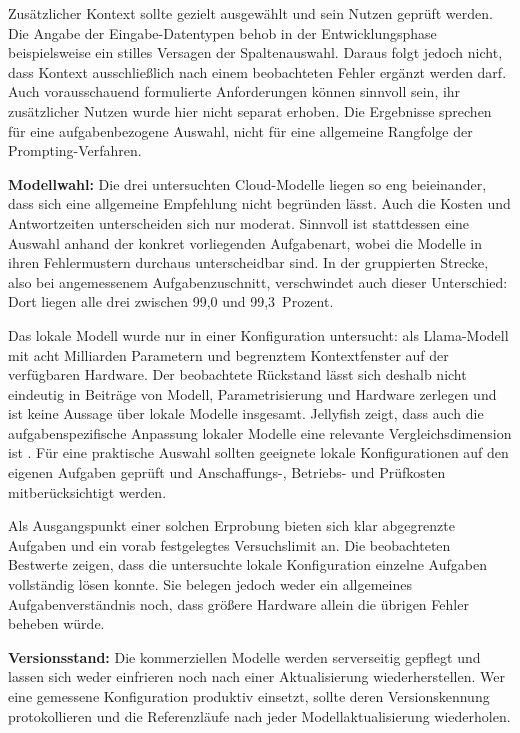 Zusätzlicher Kontext sollte gezielt ausgewählt und sein Nutzen geprüft werden. Die Angabe der Eingabe-Datentypen behob in der Entwicklungsphase beispielsweise ein stilles Versagen der Spaltenauswahl. Daraus folgt jedoch nicht, dass Kontext ausschließlich nach einem beobachteten Fehler ergänzt werden darf. Auch vorausschauend formulierte Anforderungen können sinnvoll sein, ihr zusätzlicher Nutzen wurde hier nicht separat erhoben. Die Ergebnisse sprechen für eine aufgabenbezogene Auswahl, nicht für eine allgemeine Rangfolge der Prompting-Verfahren.

\noindent\textbf{Modellwahl:} Die drei untersuchten Cloud-Modelle liegen so eng beieinander, dass sich eine allgemeine Empfehlung nicht begründen lässt. Auch die Kosten und Antwortzeiten unterscheiden sich nur moderat. Sinnvoll ist stattdessen eine Auswahl anhand der konkret vorliegenden Aufgabenart, wobei die Modelle in ihren Fehlermustern durchaus unterscheidbar sind. In der gruppierten Strecke, also bei angemessenem Aufgabenzuschnitt, verschwindet auch dieser Unterschied: Dort liegen alle drei zwischen 99,0 und 99,3~Prozent.

 Das lokale Modell wurde nur in einer Konfiguration untersucht: als Llama-Modell mit acht Milliarden Parametern und begrenztem Kontextfenster auf der verfügbaren Hardware. Der beobachtete Rückstand lässt sich deshalb nicht eindeutig in Beiträge von Modell, Parametrisierung und Hardware zerlegen und ist keine Aussage über lokale Modelle insgesamt. Jellyfish zeigt, dass auch die aufgabenspezifische Anpassung lokaler Modelle eine relevante Vergleichsdimension ist \autocite{zhangJellyfish2024}. Für eine praktische Auswahl sollten geeignete lokale Konfigurationen auf den eigenen Aufgaben geprüft und Anschaffungs-, Betriebs- und Prüfkosten mitberücksichtigt werden.

Als Ausgangspunkt einer solchen Erprobung bieten sich klar abgegrenzte Aufgaben und ein vorab festgelegtes Versuchslimit an. Die beobachteten Bestwerte zeigen, dass die untersuchte lokale Konfiguration einzelne Aufgaben vollständig lösen konnte. Sie belegen jedoch weder ein allgemeines Aufgabenverständnis noch, dass größere Hardware allein die übrigen Fehler beheben würde.

\noindent\textbf{Versionsstand:} Die kommerziellen Modelle werden serverseitig gepflegt und lassen sich weder einfrieren noch nach einer Aktualisierung wiederherstellen. Wer eine gemessene Konfiguration produktiv einsetzt, sollte deren Versionskennung protokollieren und die Referenzläufe nach jeder Modellaktualisierung wiederholen.

